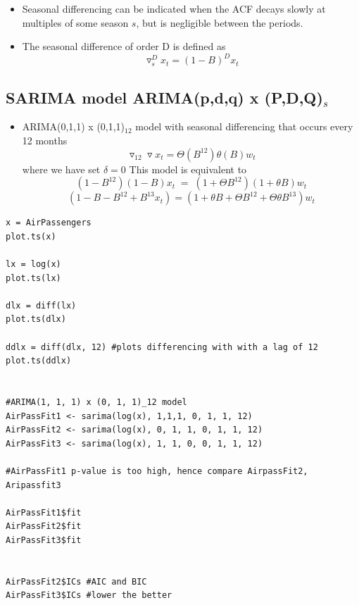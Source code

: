 \documentclass{article}
\begin{document}
\begin{itemize}
    \item Seasonal differencing can be indicated when the ACF decays slowly at multiples of some season $s$, but is negligible between the periods.
    \item The seasonal difference of order D is defined as 
    \begin{equation*}
        \triangledown_s^D x_t = (1-B)^D x_t
    \end{equation*}
\end{itemize}

\subsection{SARIMA model ARIMA(p,d,q) x (P,D,Q)$_s$}

\begin{itemize}
    \item ARIMA(0,1,1) x (0,1,1)$_{12}$ model with seasonal differencing that occurs every 12 months
    \begin{equation*}
        \triangledown_{12} \triangledown x_t  = \Theta (B^{12}) \theta(B) w_t
    \end{equation*}
    where we have set $\delta = 0$
    This model is equivalent to 
    \begin{equation*}
        (1 - B^{12})(1 - B) x_t \; = \; (1 + \Theta B^{12})(1 + \theta B)w_t 
    \end{equation*}
    \begin{equation*}
        ( 1 - B - B^{12} + B^{13} x_t) = (1 + \theta B + \Theta B^{12} + \Theta \theta B^{13})w_t
    \end{equation*}
\end{itemize}

\begin{lstlisting}
x = AirPassengers
plot.ts(x)

lx = log(x)
plot.ts(lx)

dlx = diff(lx)
plot.ts(dlx)

ddlx = diff(dlx, 12) #plots differencing with with a lag of 12
plot.ts(ddlx)


#ARIMA(1, 1, 1) x (0, 1, 1)_12 model
AirPassFit1 <- sarima(log(x), 1,1,1, 0, 1, 1, 12)
AirPassFit2 <- sarima(log(x), 0, 1, 1, 0, 1, 1, 12)
AirPassFit3 <- sarima(log(x), 1, 1, 0, 0, 1, 1, 12)

#AirPassFit1 p-value is too high, hence compare AirpassFit2, Aripassfit3

AirPassFit1$fit
AirPassFit2$fit
AirPassFit3$fit


AirPassFit2$ICs #AIC and BIC
AirPassFit3$ICs #lower the better



\end{lstlisting}
\end{document}
